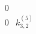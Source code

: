 \documentclass[10pt]{article}
\begin{document}
\begin{landscape}
{{\begin{align*}
0\\0 & k^{(5)}_{3,2} 
\end{align*}}}
\end{landscape}
\end{document}
